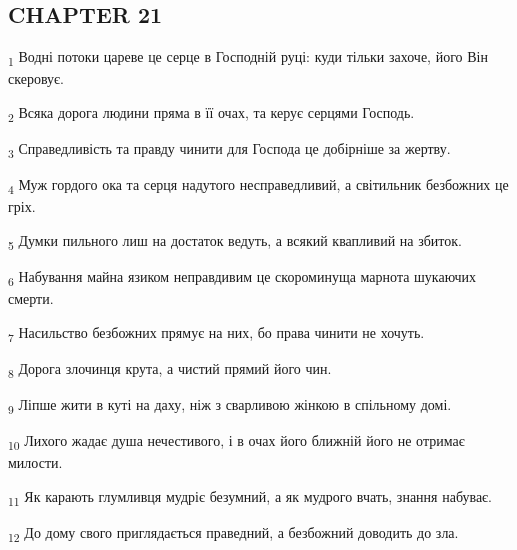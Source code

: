 \subsection{CHAPTER 21}
\begin{tcolorbox}
\textsubscript{1} Водні потоки цареве це серце в Господній руці: куди тільки захоче, його Він скеровує.
\end{tcolorbox}
\begin{tcolorbox}
\textsubscript{2} Всяка дорога людини пряма в її очах, та керує серцями Господь.
\end{tcolorbox}
\begin{tcolorbox}
\textsubscript{3} Справедливість та правду чинити для Господа це добірніше за жертву.
\end{tcolorbox}
\begin{tcolorbox}
\textsubscript{4} Муж гордого ока та серця надутого несправедливий, а світильник безбожних це гріх.
\end{tcolorbox}
\begin{tcolorbox}
\textsubscript{5} Думки пильного лиш на достаток ведуть, а всякий квапливий на збиток.
\end{tcolorbox}
\begin{tcolorbox}
\textsubscript{6} Набування майна язиком неправдивим це скороминуща марнота шукаючих смерти.
\end{tcolorbox}
\begin{tcolorbox}
\textsubscript{7} Насильство безбожних прямує на них, бо права чинити не хочуть.
\end{tcolorbox}
\begin{tcolorbox}
\textsubscript{8} Дорога злочинця крута, а чистий прямий його чин.
\end{tcolorbox}
\begin{tcolorbox}
\textsubscript{9} Ліпше жити в куті на даху, ніж з сварливою жінкою в спільному домі.
\end{tcolorbox}
\begin{tcolorbox}
\textsubscript{10} Лихого жадає душа нечестивого, і в очах його ближній його не отримає милости.
\end{tcolorbox}
\begin{tcolorbox}
\textsubscript{11} Як карають глумливця мудріє безумний, а як мудрого вчать, знання набуває.
\end{tcolorbox}
\begin{tcolorbox}
\textsubscript{12} До дому свого приглядається праведний, а безбожний доводить до зла.
\end{tcolorbox}
